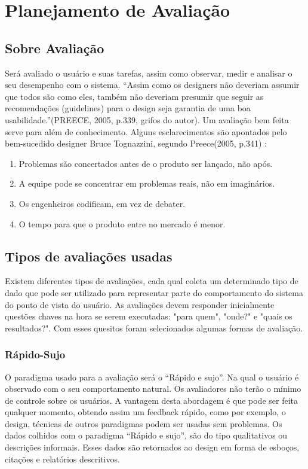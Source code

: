 \chapter[Planejamento de Avaliação]{Planejamento de Avaliação}

\section{Sobre Avaliação}

	Será avaliado o usuário e suas tarefas, assim como observar, medir e analisar o seu desempenho com o sistema. 
	“Assim como os designers não deveriam assumir que todos são como eles, também não deveriam presumir que seguir as recomendações (guidelines) para o design seja garantia de uma boa usabilidade.”(PREECE, 2005, p.339, grifos do autor).
	Um avaliação bem feita serve para além de conhecimento. Alguns esclarecimentos são apontados pelo bem-sucedido designer Bruce Tognazzini, segundo Preece(2005, p.341) \nocite{jeniffer05}:

\begin{enumerate}
	\item Problemas são concertados antes de o produto ser lançado, não após.
	\item A equipe pode se concentrar em problemas reais, não em imaginários.
	\item Os engenheiros codificam, em vez de debater.
	\item O tempo para que o produto entre no mercado é menor.
\end{enumerate}

\section{Tipos de avaliações usadas}

Existem diferentes tipos de avaliações, cada qual coleta um determinado tipo de dado que pode ser utilizado para representar parte do comportamento do sistema do ponto de vista do usuário. As avaliações devem responder inicialmente questões chaves na hora se serem executadas: "para quem", "onde?" e "quais os resultados?". Com esses quesitos foram selecionados algumas formas de avaliação.

\subsection{Rápido-Sujo}
O paradigma usado para a avaliação será o “Rápido	 e sujo”. Na qual o usuário é observado com o seu comportamento natural.
Os avaliadores não terão o mínimo de controle sobre os usuários. A vantagem desta abordagem é que pode ser feita qualquer momento, obtendo assim um feedback rápido, como por exemplo, o design, técnicas de outros paradigmas podem ser usadas sem problemas.
Os dados colhidos com o paradigma “Rápido e sujo”, são do tipo qualitativos ou descrições informais. Esses dados são retornados ao design em forma de esboços, citações e relatórios descritivos.

